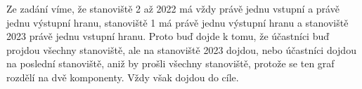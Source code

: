 \documentclass{fkssolpub}
\author{Ondřej Sedláček}
\begin{document}
 

Ze zadání víme, že stanoviště 2 až 2022 má vždy právě jednu vstupní a právě jednu
výstupní hranu, stanoviště 1 má právě jednu výstupní hranu a stanoviště 2023 právě
jednu vstupní hranu. Proto buď dojde k tomu, že účastníci buď projdou všechny 
stanoviště, ale na stanoviště 2023 dojdou, nebo účastníci dojdou na poslední 
stanoviště, aniž by prošli všechny stanoviště, protože se ten graf
rozdělí na dvě komponenty. Vždy však dojdou do cíle.
\end{document}
